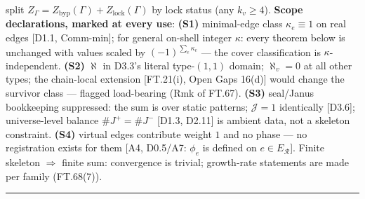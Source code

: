 \begin{definition}
split $Z_\Gamma=Z_{\mathrm{byp}}(\Gamma)+Z_{\mathrm{lock}}(\Gamma)$ by lock status (any $k_v\ge4$). \textbf{Scope declarations, marked at every use}: \textbf{(S1)} minimal-edge class $\kappa_e\equiv1$ on real edges [D1.1, Comm-min]; for general on-shell integer $\kappa$: every theorem below is unchanged with values scaled by $(-1)^{\sum_e\kappa_e}$ — the cover classification is $\kappa$-independent. \textbf{(S2)} $\aleph$ in D3.3's literal type-$(1,1)$ domain; $\aleph_v=0$ at all other types; the chain-local extension [FT.21(i), Open Gaps 16(d)] would change the survivor class — flagged load-bearing (Rmk of FT.67). \textbf{(S3)} seal/Janus bookkeeping suppressed: the sum is over static patterns; $\mathcal J=1$ identically [D3.6]; universe-level balance $\#J^+=\#J^-$ [D1.3, D2.11] is ambient data, not a skeleton constraint. \textbf{(S4)} virtual edges contribute weight $1$ and no phase — no registration exists for them [A4, D0.5/A7: $\phi_e$ is defined on $e\in E_{\mathcal R}$]. Finite skeleton $\Rightarrow$ finite sum: convergence is trivial; growth-rate statements are made per family (FT.68(7)).

\vspace{2pt}\noindent\rule{\textwidth}{0.4pt}\vspace{2pt}

\end{definition}

